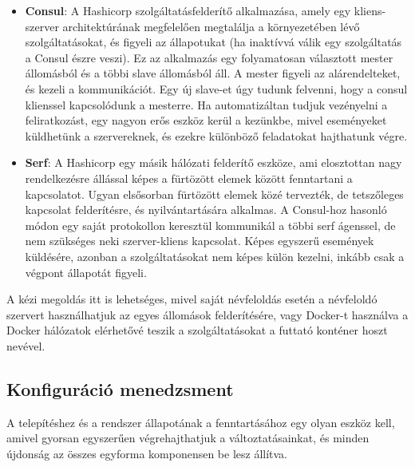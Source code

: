 \documentclass[11pt,magyar,a4paper,twoside,]{report}
\begin{document}
\begin{itemize}
\item
  \textbf{Consul}\citep{consul}: A Hashicorp szolgáltatásfelderítő
  alkalmazása, amely egy kliens-szerver architektúrának megfelelően
  megtalálja a környezetében lévő szolgáltatásokat, és figyeli az
  állapotukat (ha inaktívvá válik egy szolgáltatás a Consul észre
  veszi). Ez az alkalmazás egy folyamatosan választott mester állomásból
  és a többi slave állomásból áll. A mester figyeli az alárendelteket,
  és kezeli a kommunikációt. Egy új slave-et úgy tudunk felvenni, hogy a
  consul klienssel kapcsolódunk a mesterre. Ha automatizáltan tudjuk
  vezényelni a feliratkozást, egy nagyon erős eszköz kerül a kezünkbe,
  mivel eseményeket küldhetünk a szervereknek, és ezekre különböző
  feladatokat hajthatunk végre.
\item
  \textbf{Serf}\citep{serf}: A Hashicorp egy másik hálózati felderítő
  eszköze, ami elosztottan nagy rendelkezésre állással képes a fürtözött
  elemek között fenntartani a kapcsolatot. Ugyan elsősorban fürtözött
  elemek közé tervezték, de tetszőleges kapcsolat felderítésre, és
  nyilvántartására alkalmas. A Consul-hoz hasonló módon egy saját
  protokollon keresztül kommunikál a többi serf ágenssel, de nem
  szükséges neki szerver-kliens kapcsolat. Képes egyszerű események
  küldésére, azonban a szolgáltatásokat nem képes külön kezelni, inkább
  csak a végpont állapotát figyeli.
\end{itemize}

A kézi megoldás itt is lehetséges, mivel saját névfeloldás esetén a
névfeloldó szervert használhatjuk az egyes állomások felderítésére, vagy
Docker-t használva a Docker hálózatok elérhetővé teszik a
szolgáltatásokat a futtató konténer hoszt nevével.

\subsection{Konfiguráció
menedzsment}\label{konfiguruxe1ciuxf3-menedzsment}

A telepítéshez és a rendszer állapotának a fenntartásához egy olyan
eszköz kell, amivel gyorsan egyszerűen végrehajthatjuk a
változtatásainkat, és minden újdonság az összes egyforma komponensen be
lesz állítva.
\end{document}
